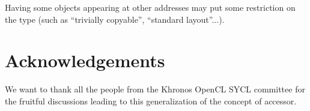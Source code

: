 \documentclass[a4paper]{article}
\begin{document}
Having some objects appearing at other addresses may put some
restriction on the type (such as ``trivially copyable'', ``standard
layout''...).


\section{Acknowledgements}
\label{sec:acknowledgements}

We want to thank all the people from the Khronos OpenCL SYCL committee
for the fruitful discussions leading to this generalization of the
concept of accessor.
\end{document}
